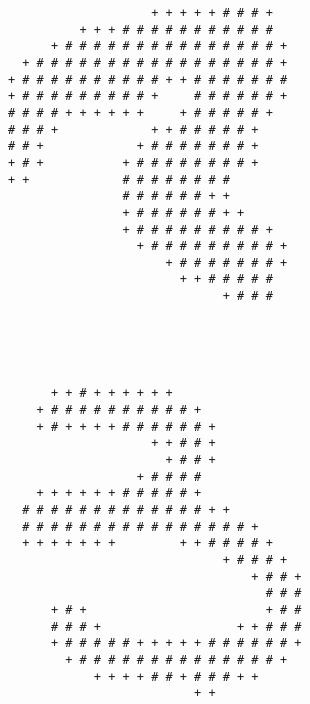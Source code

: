 \begin{multicols*}{2}
\begin{Verbatim}[samepage=true]
                                                        
\end{Verbatim}
\begin{Verbatim}[samepage=true]
                                                        
                                                        
                          + + + + + # # # +             
                + + + # # # # # # # # # # #             
            + # # # # # # # # # # # # # # # +           
        + # # # # # # # # # # # # # # # # # +           
      + # # # # # # # # # # + + # # # # # # #           
      + # # # # # # # # # +     # # # # # # +           
      # # # # + + + + + +     + # # # # # +             
      # # # +             + + # # # # # +               
      # # +             + # # # # # # # +               
      + # +           + # # # # # # # # +               
      + +             # # # # # # # #                   
                      # # # # # # + +                   
                      + # # # # # # + +                 
                      + # # # # # # # # # +             
                        + # # # # # # # # # +           
                            + # # # # # # # +           
                              + + # # # # #             
                                    + # # #             
                                                        
                                                        
\end{Verbatim}
\begin{Verbatim}[samepage=true]
                                                        
                                                        
            + + # + + + + + +                           
          + # # # # # # # # # # +                       
          + # + + + + # # # # # # +                     
                          + + # # +                     
                            + # # +                     
                        + # # # #                       
          + + + + + + # # # # # +                       
        # # # # # # # # # # # # # + +                   
        # # # # # # # # # # # # # # # # +               
        + + + + + + +         + + # # # # +             
                                    + # # # +           
                                        + # # +         
                                          # # #         
            + # +                         + # #         
            # # # +                   + + # # #         
            + # # # # # + + + + + # # # # # # +         
              + # # # # # # # # # # # # # # +           
                  + + + + # # + # # # + +               
                                + +                     
                                                        

\end{Verbatim}
\end{multicols*}
